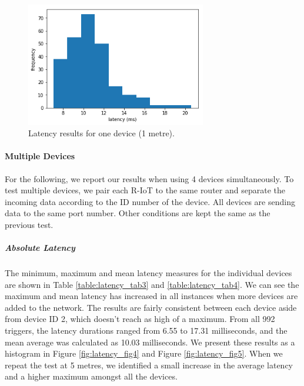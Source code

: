 \begin{figure}[htbp]
  \centering
    \includegraphics[width=0.7\textwidth]{Chapters/Figures/technical/Latency/figure3.png}
    \caption{Latency results for one device (1 metre).}
    \label{fig:latency_fig3}
\end{figure}

\paragraph{Multiple Devices}

For the following, we report our results when using 4 devices simultaneously. To test multiple devices, we pair each R-IoT to the same router and separate the incoming data according to the ID number of the device. All devices are sending data to the same port number. Other conditions are kept the same as the previous test.


\subparagraph{Absolute Latency}
The minimum, maximum and mean latency measures for the individual devices are shown in Table \ref{table:latency_tab3} and \ref{table:latency_tab4}. We can see the maximum and mean latency has increased in all instances when more devices are added to the network. The results are fairly consistent between each device aside from device ID 2, which doesn’t reach as high of a maximum. From all 992 triggers, the latency durations ranged from 6.55 to 17.31 milliseconds, and the mean average was calculated as 10.03 milliseconds. We present these results as a histogram in Figure \ref{fig:latency_fig4} and Figure \ref{fig:latency_fig5}. When we repeat the test at 5 metres, we identified a small increase in the average latency and a higher maximum amongst all the devices.


